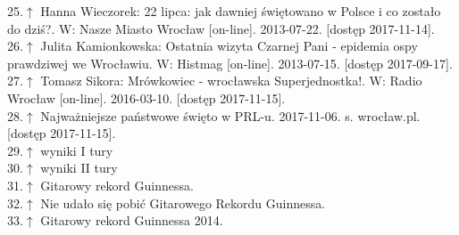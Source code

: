 \documentclass{article}
\begin{document}
25.\hyperref[225]{$\uparrow$} Hanna Wieczorek: 22 lipca: jak dawniej świętowano w Polsce i co zostało do dziś?. W: Nasze Miasto Wrocław [on-line]. 2013-07-22. [dostęp 2017-11-14].\label{25}\\
26.\hyperref[226]{$\uparrow$} Julita Kamionkowska: Ostatnia wizyta Czarnej Pani - epidemia ospy prawdziwej we Wrocławiu. W: Histmag [on-line]. 2013-07-15. [dostęp 2017-09-17].\label{26}\\
27.\hyperref[227]{$\uparrow$} Tomasz Sikora: Mrówkowiec - wrocławska Superjednostka!. W: Radio Wrocław [on-line]. 2016-03-10. [dostęp 2017-11-15].\label{27}\\
28.\hyperref[228]{$\uparrow$} Najważniejsze państwowe święto w PRL-u. 2017-11-06. s. wrocław.pl. [dostęp 2017-11-15].\label{28}\\
29.\hyperref[229]{$\uparrow$} wyniki I tury\label{29}\\
30.\hyperref[330]{$\uparrow$} wyniki II tury\label{30}\\
31.\hyperref[331]{$\uparrow$} Gitarowy rekord Guinnessa.\label{31}\\
32.\hyperref[332]{$\uparrow$} Nie udało się pobić Gitarowego Rekordu Guinnessa.\label{32}\\
33.\hyperref[333]{$\uparrow$} Gitarowy rekord Guinnessa 2014.\label{33}\\
\end{document}
